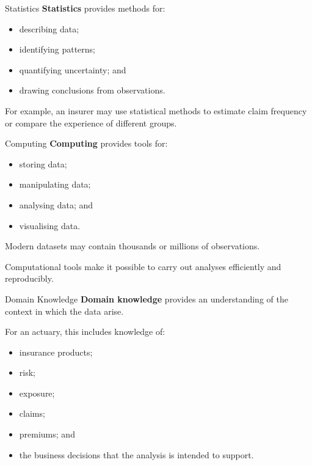 \documentclass[
  ignorenonframetext,
  aspectratio=169,
]{beamer}
\providecommand{\tightlist}{%
  \setlength{\itemsep}{0pt}\setlength{\parskip}{0pt}}
\begin{document}
\begin{frame}{Statistics}
\protect{}\label{statistics}
\textbf{Statistics} provides methods for:

\begin{itemize}
\tightlist
\item
  describing data;
\item
  identifying patterns;
\item
  quantifying uncertainty; and
\item
  drawing conclusions from observations.
\end{itemize}

For example, an insurer may use statistical methods to estimate claim
frequency or compare the experience of different groups.
\end{frame}

\begin{frame}{Computing}
\protect{}\label{computing}
\textbf{Computing} provides tools for:

\begin{itemize}
\tightlist
\item
  storing data;
\item
  manipulating data;
\item
  analysing data; and
\item
  visualising data.
\end{itemize}

Modern datasets may contain thousands or millions of observations.

Computational tools make it possible to carry out analyses efficiently
and reproducibly.
\end{frame}

\begin{frame}{Domain Knowledge}
\protect{}\label{domain-knowledge}
\textbf{Domain knowledge} provides an understanding of the context in
which the data arise.

For an actuary, this includes knowledge of:

\begin{itemize}
\tightlist
\item
  insurance products;
\item
  risk;
\item
  exposure;
\item
  claims;
\item
  premiums; and
\item
  the business decisions that the analysis is intended to support.
\end{itemize}
\end{frame}
\end{document}
